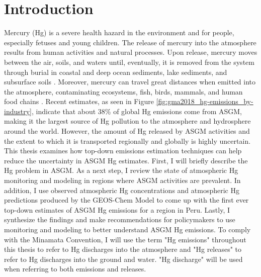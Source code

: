 
\chapter{Introduction}
Mercury (Hg) is a severe health hazard in the environment and for people, especially fetuses and young children\cite{gibb_mercury_2014}. The release of mercury into the atmosphere results from human activities and natural processes. Upon release, mercury moves between the air, soils, and waters until, eventually, it is removed from the system through burial in coastal and deep ocean sediments, lake sediments, and subsurface soils \cite{esdaile_mercury_2018}. Moreover, mercury can travel great distances when emitted into the atmosphere, contaminating ecosystems, fish, birds, mammals, and human food chains \cite{esdaile_mercury_2018}. Recent estimates, as seen in Figure \ref{fig:gma2018_hg-emissions_by-industry},  indicate that about 38\% of global Hg emissions come from ASGM, making it the largest source of Hg pollution to the atmosphere and hydrosphere around the world\cite{united_nations_environment_programme_technical_2019}. However, the amount of Hg released by ASGM activities and the extent to which it is transported regionally and globally is highly uncertain. This thesis examines how top-down emissions estimation techniques can help reduce the uncertainty in ASGM Hg estimates. First, I will briefly describe the Hg problem in ASGM. As a next step, I review the state of atmospheric Hg monitoring and modeling in regions where ASGM activities are prevalent. In addition, I use observed atmospheric Hg concentrations and atmospheric Hg predictions produced by the GEOS-Chem Model to come up with the first ever top-down estimates of ASGM Hg emissions for a region in Peru. Lastly, I synthesize the findings and make recommendations for policymakers to use monitoring and modeling to better understand ASGM Hg emissions. To comply with the Minamata Convention, I will use the term "Hg emissions" throughout this thesis to refer to Hg discharges into the atmosphere and "Hg releases" to refer to Hg discharges into the ground and water. "Hg discharge" will be used when referring to both emissions and releases.

